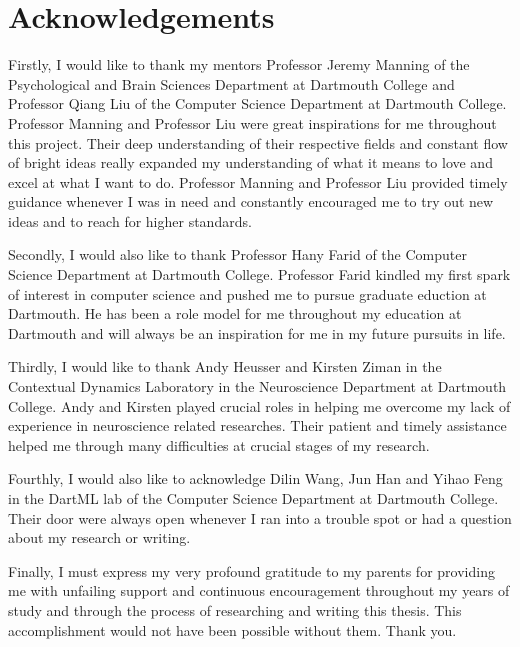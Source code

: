 \documentclass[11pt]{article}
\begin{document}
\newpage
\section{Acknowledgements}
Firstly, I would like to thank my mentors Professor Jeremy Manning of the Psychological and Brain Sciences Department at Dartmouth College and Professor Qiang Liu of the Computer Science Department at Dartmouth College. Professor Manning and Professor Liu were great inspirations for me throughout this project. Their deep understanding of their respective fields and constant flow of bright ideas really expanded my understanding of what it means to love and excel at what I want to do. Professor Manning and Professor Liu provided timely guidance whenever I was in need and constantly encouraged me to try out new ideas and to reach for higher standards.

Secondly, I would also like to thank Professor Hany Farid of the Computer Science Department at Dartmouth College. Professor Farid kindled my first spark of interest in computer science and pushed me to pursue graduate eduction at Dartmouth. He has been a role model for me throughout my education at Dartmouth and will always be an inspiration for me in my future pursuits in life.

Thirdly, I would like to thank Andy Heusser and Kirsten Ziman in the Contextual Dynamics Laboratory in the Neuroscience Department at Dartmouth College. Andy and Kirsten played crucial roles in helping me overcome my lack of experience in neuroscience related researches. Their patient and timely assistance helped me through many difficulties at crucial stages of my research.

Fourthly, I would also like to acknowledge Dilin Wang, Jun Han and Yihao Feng in the DartML lab of the Computer Science Department at Dartmouth College. Their door were always open whenever I ran into a trouble spot or had a question about my research or writing.

Finally, I must express my very profound gratitude to my parents for providing me with unfailing support and continuous encouragement throughout my years of study and through the process of researching and writing this thesis. This accomplishment would not have been possible without them. Thank you.

\newpage
\tableofcontents
\newpage
{}
\end{document}
